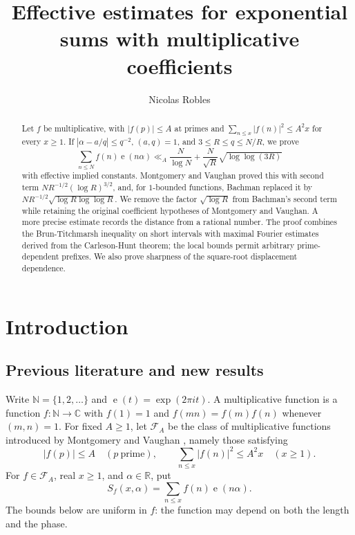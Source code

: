 \documentclass[11pt]{amsart}
\title[Exponential sums with multiplicative coefficients]{Effective estimates for exponential sums with multiplicative coefficients}
\author[N.~Robles]{Nicolas Robles}
\numberwithin{equation}{section}
\numberwithin{figure}{section}
\theoremstyle{definition}
\newcommand{\R}{\mathbb{R}}
\newcommand{\C}{\mathbb{C}}
\newcommand{\N}{\mathbb{N}}
\newcommand{\e}{\operatorname{e}}
\newcommand{\FA}{\mathcal F_A}
\begin{document}
\begin{abstract}
Let $f$ be multiplicative, with $|f(p)|\le A$ at primes and
$\sum_{n\le x}|f(n)|^2\le A^2x$ for every $x\ge1$.
If $|\alpha-a/q|\le q^{-2}$, $(a,q)=1$, and $3\le R\le q\le N/R$, we prove
\[
 \sum_{n\le N}f(n)\e(n\alpha)
 \ll_A \frac{N}{\log N}
       +\frac{N}{\sqrt R}\sqrt{\log\log(3R)}
\]
with effective implied constants. Montgomery and Vaughan
proved this with second term $NR^{-1/2}(\log R)^{3/2}$, and, for
$1$-bounded functions, Bachman replaced it by
$NR^{-1/2}\sqrt{\log R\log\log R}$. We remove the factor
$\sqrt{\log R}$ from Bachman's second term while retaining the original
coefficient hypotheses of Montgomery and Vaughan. A more precise estimate records the distance from a rational
number. The proof combines the Brun-Titchmarsh inequality
on short intervals with maximal Fourier estimates derived from the
Carleson-Hunt theorem; the local bounds permit arbitrary
prime-dependent prefixes. We also prove sharpness of the square-root
displacement dependence.
\end{abstract}

\maketitle

\section{Introduction}\label{sec:intro}

\subsection{Previous literature and new results}

Write $\N=\{1,2,\ldots\}$ and $\e(t)=\exp(2\pi i t)$. A multiplicative
function is a function $f:\N\to\C$ with $f(1)=1$ and $f(mn)=f(m)f(n)$
whenever $(m,n)=1$. For fixed $A\ge1$, let $\FA$ be the class of
multiplicative functions introduced by Montgomery and Vaughan
\cite[Section~1]{MV}, namely those satisfying
\begin{equation}\label{eq:class}
 |f(p)|\le A\quad(p\ \text{prime}),
 \qquad
 \sum_{n\le x}|f(n)|^2\le A^2x\quad(x\ge1).
\end{equation}
For $f\in\FA$, real $x\ge1$, and $\alpha\in\R$, put
\begin{equation}\label{eq:S-def}
 S_f(x,\alpha)=\sum_{n\le x}f(n)\e(n\alpha).
\end{equation}
The bounds below are uniform in $f$: the function may depend on both
the length and the phase.
\end{document}

